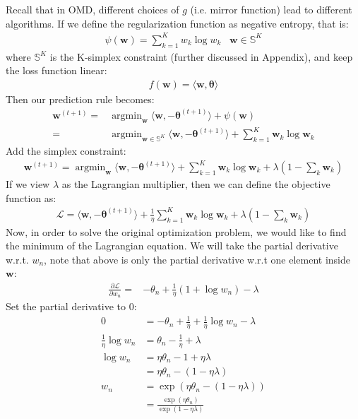 \documentclass[11pt]{article}
\DeclareMathOperator*{\argmin}{argmin}
\newcommand{\btheta}{\boldsymbol{\theta}}
\newcommand{\bw}{\boldsymbol{w}}
\begin{document}
Recall that in OMD, different choices of $g$ (i.e. mirror function) lead to different algorithms. If we define the regularization function as negative entropy, that is:
\begin{align}
    \psi(\bm{w}) = \sum_{k=1}^K  w_k \log w_k \;\;\; \bm{w} \in \mathbb{S}^K
\end{align}
where $\mathbb{S}^K$ is the K-simplex constraint (further discussed in Appendix), and keep the loss function linear:
\begin{align}
    f(\bw) = \langle \bw, \btheta \rangle
\end{align}
Then our prediction rule becomes:
\begin{align}
    \bw^{(t+1)} = & \argmin_{\bw} \langle \bw, -\btheta^{(t+1)} \rangle + \psi (\bw)\nonumber \\
    = & \argmin_{\bw \in \mathbb{S}^K} \langle \bw, -\btheta^{(t+1)} \rangle + \sum_{k=1}^{K} \bw_k \log \bw_k
\end{align}
Add the simplex constraint:
\begin{align}
    \bw^{(t+1)} = \argmin_{\bw} \langle \bw, -\btheta^{(t+1)} \rangle + \sum_{k=1}^{K} \bw_k \log \bw_k + \lambda \left( 1- \sum_k \bw_k\right)
\end{align}
If we view $\lambda$ as the Lagrangian multiplier, then we can define the objective function as:
\begin{align}
    \mathcal{L} = \langle \bw, -\btheta^{(t+1)} \rangle +  \frac{1}{\eta}\sum_{k=1}^{K} \bw_k \log \bw_k + \lambda \left( 1- \sum_k \bw_k\right)
\end{align}
Now, in order to solve the original optimization problem, we would like to find the minimum of the Lagrangian equation. We will take the partial derivative w.r.t. $w_n$, note that above is only the partial derivative w.r.t one element inside $\bw$:
\begin{align}
    \frac{\partial \mathcal{L}}{\partial w_n} = & -\theta_n + \frac{1}{\eta} (1 + \log w_n) - \lambda 
\end{align}
Set the partial derivative to $0$:
\begin{align}
    0 &= -\theta_n + \frac{1}{\eta} + \frac{1}{\eta}\log w_n - \lambda \nonumber  \\
    \frac{1}{\eta}\log w_n &= \theta_n - \frac{1}{\eta} + \lambda \nonumber\\
    \log w_n &= \eta \theta_n - 1 + \eta \lambda \nonumber\\
             &= \eta \theta_n - (1 - \eta \lambda) \nonumber\\
         w_n &= \exp(\eta \theta_n - (1 - \eta \lambda)) \nonumber\\
             &= \frac{\exp(\eta \theta_n)}{\exp (1 - \eta \lambda)}
\end{align}
\end{document}
